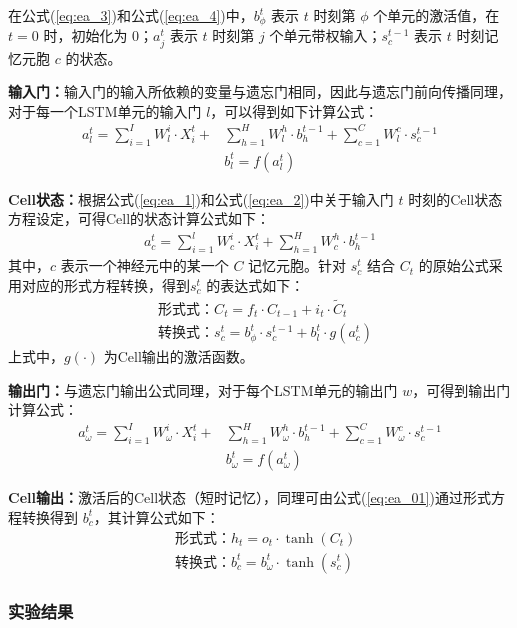 在公式(\ref{eq:ea_3})和公式(\ref{eq:ea_4})中，$b_\phi^t$ 表示 $t$ 时刻第 $\phi$ 个单元的激活值，在 $t=0$ 时，初始化为 $0$；$a_j^t$ 表示 $t$ 时刻第 $j$ 个单元带权输入；$s_c^{t-1}$ 表示 $t$ 时刻记忆元胞 $c$ 的状态。

\textbf{输入门：}输入门的输入所依赖的变量与遗忘门相同，因此与遗忘门前向传播同理，对于每一个LSTM单元的输入门 $l$，可以得到如下计算公式：
\begin{align}
    a_l^t=\sum_{i=1}^IW^i_{l} \cdot X_i^t+&\sum_{h=1}^HW^h_{l} \cdot b_h^{t-1}+\sum_{c=1}^CW^c_{l} 
\cdot s_c^{t-1} \\
    &b_l^t=f(a_l^t)
\end{align}




\textbf{Cell状态：}根据公式(\ref{eq:ea_1})和公式(\ref{eq:ea_2})中关于输入门 $t$ 时刻的Cell状态方程设定，可得Cell的状态计算公式如下：
\begin{align}
    a_c^t=\sum_{i=1}^lW^i_{c} \cdot X_i^t+\sum_{h=1}^HW^h_{c} \cdot b_h^{t-1}
\end{align}
其中，$c$ 表示一个神经元中的某一个 $C$ 记忆元胞。针对 $s_c^t$ 结合 $C_t$ 的原始公式采用对应的形式方程转换，得到$s^t_c$ 的表达式如下：
\begin{align}
    &\text{形式式：} C_t = f_t\cdot C_{t-1}+ i_t\cdot\widetilde{C}_t \\
    &\text{转换式：} s_c^t = b_\phi^t\cdot s_c^{t-1} + b_l^t\cdot g(a_c^t) 
\end{align}
上式中，$g(\cdot)$ 为Cell输出的激活函数。

\textbf{输出门：}与遗忘门输出公式同理，对于每个LSTM单元的输出门 $w$，可得到输出门计算公式：
\begin{align}
    a_\omega^t=\sum_{i=1}^IW^i_{\omega} \cdot X_i^t+&\sum_{h=1}^HW^h_{\omega} \cdot b_h^{t-1}+\sum_{c=1}^CW^c_{\omega} \cdot s_c^{t-1} \\
    &b_\omega^t=f(a_\omega^t)
\end{align}

\textbf{Cell输出：}激活后的Cell状态（短时记忆），同理可由公式(\ref{eq:ea_01})通过形式方程转换得到 $b^t_c$，其计算公式如下：
\begin{align}
    &\text{形式式：} h_t = o_t\cdot \tanh(C_t) \\
    &\text{转换式：} b_c^t = b_\omega^t \cdot \tanh(s_c^t)
\end{align}


\subsubsection{实验结果}


